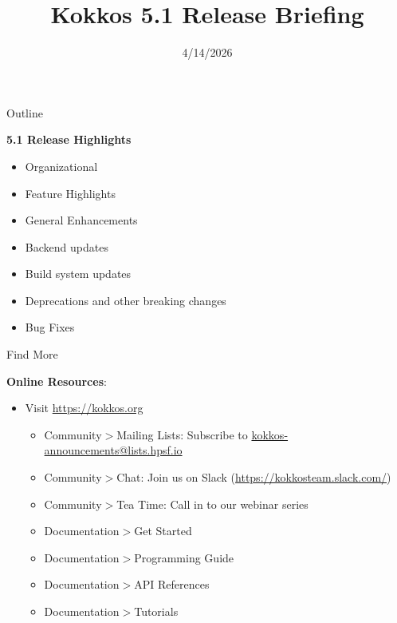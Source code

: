 
\usepackage{tikz}
\graphicspath{{5_1/figures/}}
\usepackage{multicol}
\usepackage{pgfplots}
\usepackage{xfrac}

\def\ornlid{THIS WILL NEED TO BE UPDATED AFTER RESOLUTION}

\title{Kokkos 5.1 Release Briefing}


\date{4/14/2026}





\begin{frame}
  \titlepage
\end{frame}


\begin{frame}[fragile]{Outline}

  \textbf{5.1 Release Highlights}

  \begin{itemize}
    \item{Organizational}
    \item{Feature Highlights}
    \item{General Enhancements}
    \item{Backend updates}
    \item{Build system updates}
    \item{Deprecations and other breaking changes}
    \item{Bug Fixes}
  \end{itemize}

\end{frame}

\begin{frame}{Find More}

  \textbf{Online Resources}:

  \begin{itemize}
  \item Visit \url{https://kokkos.org}
    \begin{itemize}
    \item Community$>$Mailing Lists: Subscribe to \url{kokkos-announcements@lists.hpsf.io}
    \item Community$>$Chat: Join us on Slack (\url{https://kokkosteam.slack.com/})
    \item Community$>$Tea Time: Call in to our webinar series
    \item Documentation$>$Get Started
    \item Documentation$>$Programming Guide
    \item Documentation$>$API References
    \item Documentation$>$Tutorials
    \end{itemize}
  \end{itemize}

\end{frame}

